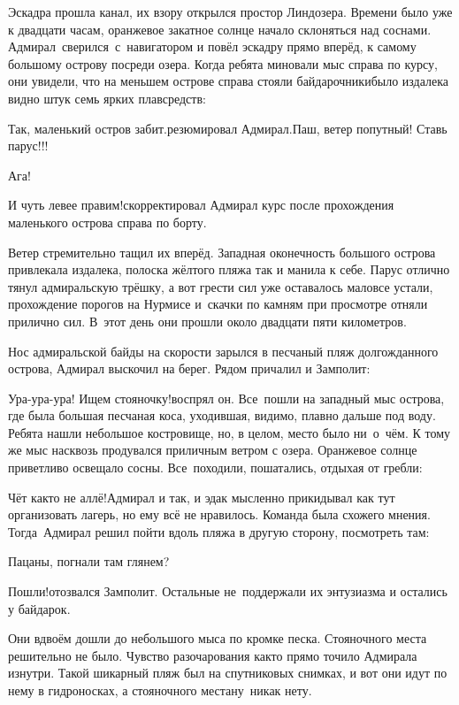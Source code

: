 Эскадра прошла канал, их взору открылся простор Линдозера. Времени было уже к двадцати часам, оранжевое закатное солнце начало склоняться над соснами. Адмирал~сверился~с~навигатором и повёл эскадру прямо вперёд, к самому большому острову посреди озера. Когда ребята миновали мыс справа по курсу, они увидели, что на меньшем острове справа стояли байдарочники\mdash было издалека видно штук семь ярких плавсредств:

\diagdash Так, маленький остров забит.\mdash резюмировал Адмирал.\mdash Паш, ветер попутный! Ставь парус!!!

\diagdash Ага!

\diagdash И чуть левее правим!\mdash скорректировал Адмирал курс после прохождения маленького острова справа по борту.

Ветер стремительно тащил их вперёд. Западная оконечность большого острова привлекала издалека, полоска жёлтого пляжа так и манила к себе. Парус отлично тянул адмиральскую трёшку, а вот грести сил уже оставалось мало\mdash все устали, прохождение порогов на Нурмисе и~скачки по камням при просмотре отняли прилично сил. В~этот день они прошли около двадцати пяти километров.

Нос адмиральской байды на скорости зарылся в песчаный пляж долгожданного острова, Адмирал выскочил на берег. Рядом причалил и Замполит:

\diagdash Ура-ура-ура! Ищем стояночку!\mdash воспрял он. Все~пошли на западный мыс острова, где была большая песчаная коса, уходившая, видимо, плавно дальше под воду. Ребята нашли небольшое костровище, но, в целом, место было ни~о~чём. К тому же мыс насквозь продувался приличным ветром с озера. Оранжевое солнце приветливо освещало сосны. Все~походили, пошатались, отдыхая от гребли:

\diagdash Чёт как\sdash то не аллё!\mdash Адмирал и так, и эдак мысленно прикидывал как тут организовать лагерь, но ему всё не нравилось. Команда была схожего мнения. Тогда~Адмирал решил пойти вдоль пляжа в другую сторону, посмотреть там:

\diagdash Пацаны, погнали там глянем?

\diagdash Пошли!\mdash отозвался Замполит. Остальные не~поддержали их энтузиазма и остались у байдарок.

Они вдвоём дошли до небольшого мыса по кромке песка. Стояночного места решительно не было. Чувство разочарования как\sdash то прямо точило Адмирала изнутри. Такой шикарный пляж был на спутниковых снимках, и вот они идут по нему в гидроносках, а стояночного места\mdash ну~никак нету.

